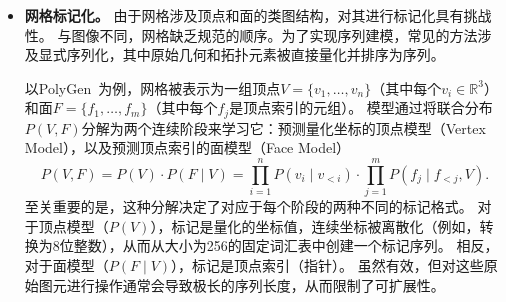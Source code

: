 \documentclass[../../book-main_zh.tex]{subfiles}
\begin{document}
\begin{itemize}
    


\item \textbf{网格标记化。} 
由于网格涉及顶点和面的类图结构，对其进行标记化具有挑战性。
与图像不同，网格缺乏规范的顺序。为了实现序列建模，常见的方法涉及显式序列化，其中原始几何和拓扑元素被直接量化并排序为序列。



以PolyGen~\cite{nash2020polygen}为例，网格被表示为一组顶点$V = \{v_1, \dots, v_n\}$（其中每个$v_i \in \mathbb{R}^3$）和面$F = \{f_1, \dots, f_m\}$（其中每个$f_j$是顶点索引的元组）。
模型通过将联合分布$P(V, F)$分解为两个连续阶段来学习它：预测量化坐标的顶点模型（Vertex Model），以及预测顶点索引的面模型（Face Model）
\begin{equation}
    P(V, F) = P(V) \cdot P(F \mid V) = \prod_{i=1}^{n} P(v_i \mid v_{<i}) \cdot \prod_{j=1}^{m} P(f_j \mid f_{<j}, V).
\end{equation}
至关重要的是，这种分解决定了对应于每个阶段的两种不同的标记格式。
对于顶点模型（$P(V)$），标记是量化的坐标值，连续坐标被离散化（例如，转换为8位整数），从而从大小为256的固定词汇表中创建一个标记序列。
相反，对于面模型（$P(F \mid V)$），标记是顶点索引（指针）。
虽然有效，但对这些原始图元进行操作通常会导致极长的序列长度，从而限制了可扩展性。


\end{itemize}
\end{document}
